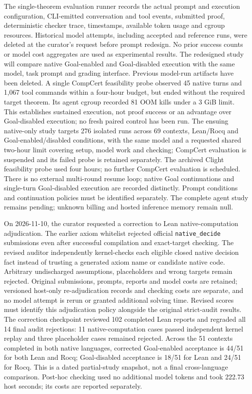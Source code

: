 \documentclass{article}
\begin{document}
The single-theorem evaluation runner records the actual prompt and execution configuration, CLI-emitted conversation and tool events, submitted proof, deterministic checker trace, timestamps, available token usage and cgroup resources. Historical model attempts, including accepted and reference runs, were deleted at the curator's request before prompt redesign. No prior success counts or model cost aggregates are used as experimental results. The redesigned study will compare native Goal-enabled and Goal-disabled execution with the same model, task prompt and grading interface. Previous model-run artifacts have been deleted. A single CompCert feasibility probe observed 45 native turns and 1,067 tool commands within a four-hour budget, but ended without the required target theorem. Its agent cgroup recorded 81 OOM kills under a 3 GiB limit. This establishes sustained execution, not proof success or an advantage over Goal-disabled execution; no fresh paired control has been run. The ensuing native-only study targets 276 isolated runs across 69 contexts, Lean/Rocq and Goal-enabled/disabled conditions, with the same model and a requested shared two-hour limit covering setup, model work and checking; CompCert evaluation is suspended and its failed probe is retained separately. The archived Clight feasibility probe used four hours; no further CompCert evaluation is scheduled. There is no external multi-round resume loop; native Goal continuations and single-turn Goal-disabled execution are recorded distinctly. Prompt conditions and continuation policies must be identified separately. The complete agent study remains pending; unknown billing and hosted inference memory remain null.

On 2026-11-10, the curator requested a correction to Lean native-computation adjudication. The earlier axiom whitelist rejected official \texttt{native\_decide} submissions even after successful compilation and exact-target checking. The revised auditor independently kernel-checks each eligible closed native decision fact instead of trusting a generated axiom name or candidate native code. Arbitrary undischarged assumptions, placeholders and wrong targets remain rejected. Original submissions, prompts, reports and model costs are retained; versioned host-only re-adjudication records and checking costs are separate, and no model attempt is rerun or granted additional solving time. Revised scores must identify this adjudication policy alongside the original strict-audit results. The correction checkpoint reviewed 102 completed Lean reports and regraded all 14 final audit rejections: 11 native-computation cases passed independent kernel replay and three placeholder cases remained rejected. Across the 51 contexts completed in both native languages, corrected Goal-enabled acceptance is 44/51 for both Lean and Rocq; Goal-disabled acceptance is 18/51 for Lean and 24/51 for Rocq. This is a dated partial-study snapshot, not a final cross-language comparison. Post-hoc checking used no additional model tokens and took 222.73 host seconds; its costs are reported separately.
\end{document}

